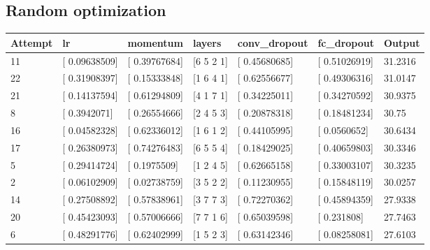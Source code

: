
\FloatBarrier
\subsection{Random optimization}

\begin{table}[h]
    \centering
    \small
    \begin{tabular}{@{}lllllll@{}}
    \toprule
    \textbf{Attempt} & \textbf{lr}       & \textbf{momentum} & \textbf{layers} & \textbf{conv\_dropout} & \textbf{fc\_dropout} & \textbf{Output} \\ \midrule
    11               & {[} 0.09638509{]} & {[} 0.39767684{]} & {[}6 5 2 1{]}   & {[} 0.45680685{]}      & {[} 0.51026919{]}    & 31.2316         \\
    22               & {[} 0.31908397{]} & {[} 0.15333848{]} & {[}1 6 4 1{]}   & {[} 0.62556677{]}      & {[} 0.49306316{]}    & 31.0147         \\
    21               & {[} 0.14137594{]} & {[} 0.61294809{]} & {[}4 1 7 1{]}   & {[} 0.34225011{]}      & {[} 0.34270592{]}    & 30.9375         \\
    8                & {[} 0.3942071{]}  & {[} 0.26554666{]} & {[}2 4 5 3{]}   & {[} 0.20878318{]}      & {[} 0.18481234{]}    & 30.75           \\
    16               & {[} 0.04582328{]} & {[} 0.62336012{]} & {[}1 6 1 2{]}   & {[} 0.44105995{]}      & {[} 0.0560652{]}     & 30.6434         \\
    17               & {[} 0.26380973{]} & {[} 0.74276483{]} & {[}6 5 5 4{]}   & {[} 0.18429025{]}      & {[} 0.40659803{]}    & 30.3346         \\
    5                & {[} 0.29414724{]} & {[} 0.1975509{]}  & {[}1 2 4 5{]}   & {[} 0.62665158{]}      & {[} 0.33003107{]}    & 30.3235         \\
    2                & {[} 0.06102909{]} & {[} 0.02738759{]} & {[}3 5 2 2{]}   & {[} 0.11230955{]}      & {[} 0.15848119{]}    & 30.0257         \\
    14               & {[} 0.27508892{]} & {[} 0.57838961{]} & {[}3 7 7 3{]}   & {[} 0.72270362{]}      & {[} 0.45894359{]}    & 27.9338         \\
    20               & {[} 0.45423093{]} & {[} 0.57006666{]} & {[}7 7 1 6{]}   & {[} 0.65039598{]}      & {[} 0.231808{]}      & 27.7463         \\
    6                & {[} 0.48291776{]} & {[} 0.62402999{]} & {[}1 5 2 3{]}   & {[} 0.63142346{]}      & {[} 0.08258081{]}    & 27.6103         \\

\end{tabular}
\end{table}
